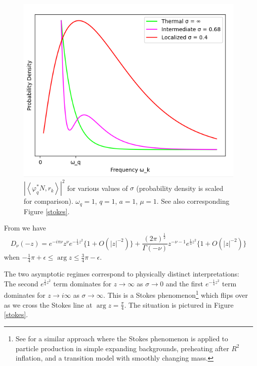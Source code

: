 \documentclass[12pt,a4paper]{article}
\begin{document}
\begin{figure}
\centering
\includegraphics[scale=0.5]{pcf.png}
\caption{$\left|\left< \varphi^*_q N, r_k \right>\right|^2$ for various values of $\sigma$ (probability density is scaled for comparison). $\omega_q = 1$, $q = 1$, $a=1$, $\mu = 1$. See also corresponding Figure \ref{stokes}.}
\label{pcf_sigma_curves}
\end{figure}
From \cite{Olver1959UniformAE} we have
\begin{equation}
  D_\nu(-z) = e^{-i\pi\nu}z^{\nu}e^{-\frac{1}{4}z^2} \{ 1 + O(|z|^{-2}) \} + \frac{(2 \pi)^{\frac{1}{2}}}{\Gamma(-\nu)} z^{-\nu - 1} e^{\frac{1}{4}z^2} \{1 + O(|z|^{-2})\}
\label{asym}
\end{equation}
when $-\frac{1}{4}\pi + \epsilon \le \arg z \le \frac{3}{4} \pi - \epsilon$.

The two asymptotic regimes correspond to physically distinct interpretations: The second $e^{\frac{1}{4}z^2}$ term dominates for $z \to \infty$ as $\sigma \to 0$ and the first  $e^{-\frac{1}{4}z^2}$ term dominates for $z \to i \infty$ as $\sigma \to \infty$.  This is a Stokes phenomenon\footnote{See \cite{hashiba2021stokes} for a similar approach where the Stokes phenomenon is applied to particle production in simple expanding backgrounds, preheating after $R^2$ inflation, and a transition model with smoothly changing mass.} which flips over as we cross the Stokes line at $\arg z = \frac{\pi}{4}$. The situation is pictured in Figure \ref{stokes}.
\end{document}
